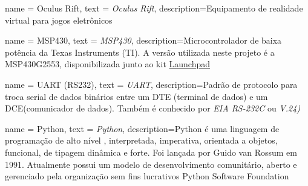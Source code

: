 {
	name = Oculus Rift,
	text = \textit{Oculus Rift},
	description={Equipamento de realidade virtual para jogos eletrônicos}
}

{
	name = MSP430,
	text = \textit{MSP430},
	description={Microcontrolador de baixa potência da Texas Instruments (TI). A versão utilizada neste projeto é a MSP430G2553, disponibilizada junto ao kit \href{http://www.ti.com/tool/msp-exp430g2}{Launchpad}}
}

{
	name = UART (RS232),
	text = \textit{UART},
	description={Padrão de protocolo para troca serial de dados binários entre um DTE (terminal de dados) e um DCE(comunicador de dados). Também é conhecido por \textit{EIA RS-232C} ou \textit{V.24)}}
}

{
	name = Python,
	text = \textit{Python},
	description={Python é uma linguagem de programação de alto nível , interpretada, imperativa, orientada a objetos, funcional, de tipagem dinâmica e forte. Foi lançada por Guido van Rossum em 1991\cite{python_history}. Atualmente possui um modelo de desenvolvimento comunitário, aberto e gerenciado pela organização sem fins lucrativos Python Software Foundation}
}